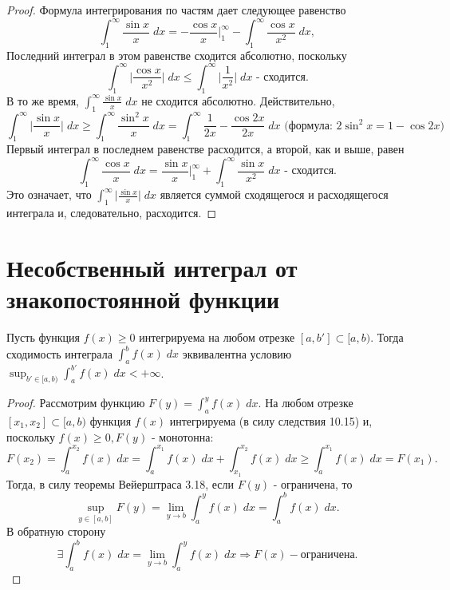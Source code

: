     \begin{proof}
		Формула интегрирования по частям дает следующее равенство
		\[ \int_1^{\infty} \frac{\sin{x}}{x} \; dx = -\frac{\cos{x}}{x} \bigg|_1^{\infty} - \int_1^{\infty} \frac{\cos{x}}{x^2} \; dx, \]
		Последний интеграл в этом равенстве сходится абсолютно, поскольку
		\[ \int_1^{\infty} \bigg|\frac{\cos{x}}{x^2}\bigg| \; dx \leqslant \int_1^{\infty} \bigg|\frac{1}{x^2}\bigg| \; dx \text{ - сходится.} \]
		В то же время, $\displaystyle \int_1^{\infty} \frac{\sin{x}}{x} \; dx$ не сходится абсолютно. Действительно,
		\[ \int_1^{\infty} \bigg|\frac{\sin{x}}{x}\bigg| \; dx \geqslant \int_1^{\infty} \frac{\sin^2{x}}{x} \; dx = \int_1^{\infty} \frac{1}{2x} - \frac{\cos{2x}}{2x} \; dx \text{ (формула: } 2\sin^2{x} = 1 - \cos{2x}) \]
		Первый интеграл в последнем равенстве расходится, а второй, как и выше, равен
		\[ \int_1^{\infty} \frac{\cos{x}}{x} \; dx = \frac{\sin{x}}{x} \bigg|_1^{\infty} + \int_1^{\infty} \frac{\sin{x}}{x^2} \; dx \text{ - сходится.} \]
		Это означает, что $\displaystyle \int_1^{\infty} \bigg|\frac{\sin{x}}{x}\bigg| \; dx$ является суммой сходящегося и расходящегося интеграла и, следовательно, расходится.
	\end{proof}
	
	\section{Несобственный интеграл от знакопостоянной функции}
	
	\begin{theorem}
		Пусть функция $f(x) \geqslant 0$ интегрируема на любом отрезке
		$[a, b'] \subset [a, b)$. Тогда сходимость интеграла $\displaystyle \int_a^b f(x) \; dx$	эквивалентна условию $\displaystyle \sup_{b' \in [a, b)} {\int_a^{b'} f(x) \; dx < +\infty}$.
	\end{theorem}
	
	\begin{proof}
		Рассмотрим функцию $F(y) = \int_a^y f(x) \; dx$. На любом отрезке $[x_1, x_2] \subset [a, b)$ функция $f(x)$ интегрируема (в силу следствия 10.15) и, поскольку $f(x) \geqslant 0, F(y)$ - монотонна:
		\[ F(x_2) = \int_a^{x_2} f(x) \; dx = \int_a^{x_1} f(x) \; dx + \int_{x_1}^{x_2} f(x) \; dx \geqslant  \int_a^{x_1} f(x) \; dx = F(x_1). \]
		Тогда, в силу теоремы Вейерштраса 3.18, если $F(y)$ - ограничена, то
		\[ \sup_{y \in [a, b]} F(y) = \lim_{y \to b} \int_a^y f(x) \; dx = \int_a^b f(x) \; dx. \]
		В обратную сторону
		\[ \exists \int_a^b f(x) \; dx = \lim_{y \to b} \int_a^y f(x) \; dx \Rightarrow F(x) - \text{ограничена.} \]
	\end{proof}
	
